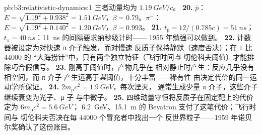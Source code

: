 \begin{solution}{pb:b3:relativistic-dynamics:1}
三者动量均为 $\qty{1.19}{GeV}/c$。
\textbf{20.} $\bar p$：$E = \sqrt{1.19^2 + 0.938^2} =
\qty{1.51}{GeV}$，$\beta = 0.79$。$\pi^-$：$E = \sqrt{1.19^2 +
0.140^2} = \qty{1.20}{GeV}$，$\beta = 0.993$。
\textbf{21.} $t_{\bar p} = 12/(0.785c) = \qty{51}{ns}$；$t_\pi =
\qty{40}{ns}$：\qty{11}{ns} 的间隔要求纳秒级计时——
1955 年勉强可以做到。
\textbf{22.} 计数器被设定为对快速 π 介子触发，而对慢速
反质子保持静默（速度否决）；在 $1$ 比 $44000$ 的
“大海捞针”中，只有两个独立特征（飞行时间\emph{与}
切伦科夫阈值）才能排除巧合假信号。
\textbf{23.} 刚高于阈值时，产物几乎在
相对静止时产生：反应几乎没有相空间，而 π 介子
产生远高于\emph{其}阈值，十分丰富——稀有性
由决定代价的同一运动学所保证。
\textbf{24.} $2m_{\text{p}}c^2 = \qty{1.9}{GeV}$，每次湮灭，
通常生成少量 π 介子，这些介子继续衰变为光子、μ 子
与中微子。
\textbf{25.} 四维动量守恒将反质子在固定靶上的代价定为
$6m_{\text{p}}c^2 = \qty{5.6}{GeV}$；
\qty{6.2}{GeV}、\qty{15.1}{m} 的 Bevatron 支付了这笔代价；飞行时间与
切伦科夫否决在每 $44000$ 个冒充者中找出一个
反世界粒子——1959 年诺贝尔奖确认了这份账目。
\end{solution}
